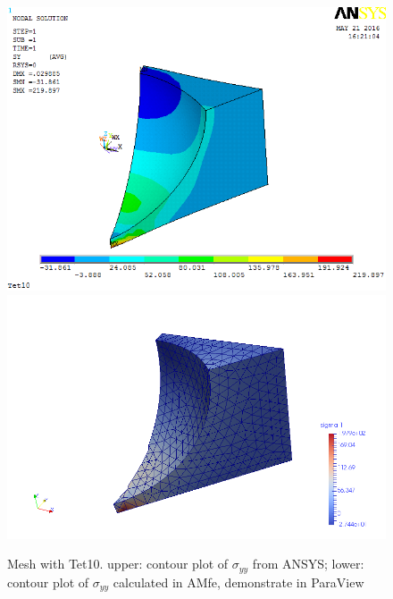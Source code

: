 \begin{figure}[htbp]
	\begin{center}
		\includegraphics[width=13cm,clip]{Tet10_Syy.png} 		
		\includegraphics[width=13cm,clip]{Tet10_Syy_P.png} 		
		\caption{Mesh with Tet10. upper: contour plot of $\sigma_{yy}$ from ANSYS; lower: contour plot of $\sigma_{yy}$ calculated in AMfe, demonstrate in ParaView} \label{fig: Tet10_Syy}
	\end{center}
\end{figure}
\clearpage 

